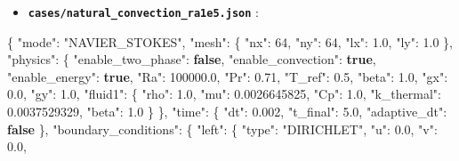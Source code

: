\documentclass[
  10pt,
]{article}
\newenvironment{Shaded}{}{}
\newcommand{\DataTypeTok}[1]{\textcolor[rgb]{0.56,0.13,0.00}{#1}}
\newcommand{\DecValTok}[1]{\textcolor[rgb]{0.25,0.63,0.44}{#1}}
\newcommand{\FloatTok}[1]{\textcolor[rgb]{0.25,0.63,0.44}{#1}}
\newcommand{\FunctionTok}[1]{\textcolor[rgb]{0.02,0.16,0.49}{#1}}
\newcommand{\KeywordTok}[1]{\textcolor[rgb]{0.00,0.44,0.13}{\textbf{#1}}}
\newcommand{\StringTok}[1]{\textcolor[rgb]{0.25,0.44,0.63}{#1}}
\providecommand{\tightlist}{%
  \setlength{\itemsep}{0pt}\setlength{\parskip}{0pt}}
\begin{document}
\begin{itemize}
\tightlist
\item
  \textbf{\texttt{cases/natural\_convection\_ra1e5.json}} :
\end{itemize}

\begin{Shaded}
\begin{Highlighting}[]
\FunctionTok{\{}
  \DataTypeTok{"mode"}\FunctionTok{:} \StringTok{"NAVIER\_STOKES"}\FunctionTok{,}
  \DataTypeTok{"mesh"}\FunctionTok{:} \FunctionTok{\{}
    \DataTypeTok{"nx"}\FunctionTok{:} \DecValTok{64}\FunctionTok{,}
    \DataTypeTok{"ny"}\FunctionTok{:} \DecValTok{64}\FunctionTok{,}
    \DataTypeTok{"lx"}\FunctionTok{:} \FloatTok{1.0}\FunctionTok{,}
    \DataTypeTok{"ly"}\FunctionTok{:} \FloatTok{1.0}
  \FunctionTok{\},}
  \DataTypeTok{"physics"}\FunctionTok{:} \FunctionTok{\{}
    \DataTypeTok{"enable\_two\_phase"}\FunctionTok{:} \KeywordTok{false}\FunctionTok{,}
    \DataTypeTok{"enable\_convection"}\FunctionTok{:} \KeywordTok{true}\FunctionTok{,}
    \DataTypeTok{"enable\_energy"}\FunctionTok{:} \KeywordTok{true}\FunctionTok{,}
    \DataTypeTok{"Ra"}\FunctionTok{:} \FloatTok{100000.0}\FunctionTok{,}
    \DataTypeTok{"Pr"}\FunctionTok{:} \FloatTok{0.71}\FunctionTok{,}
    \DataTypeTok{"T\_ref"}\FunctionTok{:} \FloatTok{0.5}\FunctionTok{,}
    \DataTypeTok{"beta"}\FunctionTok{:} \FloatTok{1.0}\FunctionTok{,}
    \DataTypeTok{"gx"}\FunctionTok{:} \FloatTok{0.0}\FunctionTok{,}
    \DataTypeTok{"gy"}\FunctionTok{:} \FloatTok{1.0}\FunctionTok{,}
    \DataTypeTok{"fluid1"}\FunctionTok{:} \FunctionTok{\{}
      \DataTypeTok{"rho"}\FunctionTok{:} \FloatTok{1.0}\FunctionTok{,}
      \DataTypeTok{"mu"}\FunctionTok{:} \FloatTok{0.0026645825}\FunctionTok{,}
      \DataTypeTok{"Cp"}\FunctionTok{:} \FloatTok{1.0}\FunctionTok{,}
      \DataTypeTok{"k\_thermal"}\FunctionTok{:} \FloatTok{0.0037529329}\FunctionTok{,}
      \DataTypeTok{"beta"}\FunctionTok{:} \FloatTok{1.0}
    \FunctionTok{\}}
  \FunctionTok{\},}
  \DataTypeTok{"time"}\FunctionTok{:} \FunctionTok{\{}
    \DataTypeTok{"dt"}\FunctionTok{:} \FloatTok{0.002}\FunctionTok{,}
    \DataTypeTok{"t\_final"}\FunctionTok{:} \FloatTok{5.0}\FunctionTok{,}
    \DataTypeTok{"adaptive\_dt"}\FunctionTok{:} \KeywordTok{false}
  \FunctionTok{\},}
  \DataTypeTok{"boundary\_conditions"}\FunctionTok{:} \FunctionTok{\{}
    \DataTypeTok{"left"}\FunctionTok{:} \FunctionTok{\{}
      \DataTypeTok{"type"}\FunctionTok{:} \StringTok{"DIRICHLET"}\FunctionTok{,}
      \DataTypeTok{"u"}\FunctionTok{:} \FloatTok{0.0}\FunctionTok{,}
      \DataTypeTok{"v"}\FunctionTok{:} \FloatTok{0.0}\FunctionTok{,}

\end{Highlighting}
\end{Shaded}
\end{document}
